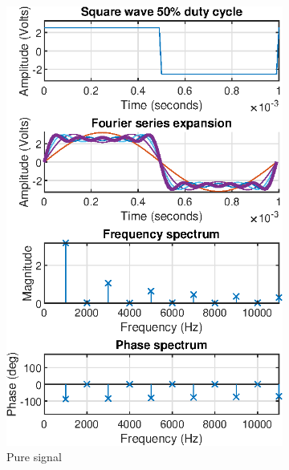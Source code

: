 \documentclass[notitlepage, a4paper, 11pt]{article}
\begin{document}
	\begin{figure}[H]
		\centering
		\begin{subfigure}{0.45\textwidth}
			\includegraphics[width=\textwidth]{../Matlab/img/sqr50}
			\caption{Pure signal}
		\end{subfigure}
		\begin{subfigure}{0.45\textwidth}

\end{subfigure}
\end{figure}
\end{document}
